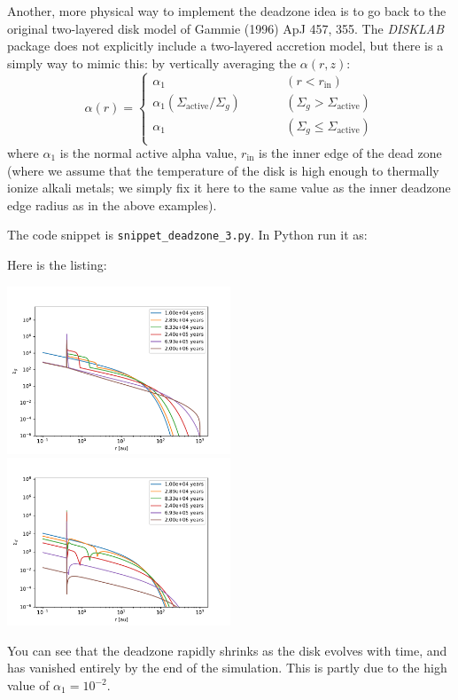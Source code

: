\documentclass{book}
\newcommand{\code}[1]{{\small\tt #1}}
\begin{document}
Another, more physical way to implement the deadzone idea is to go back to the
original two-layered disk model of Gammie (1996) ApJ 457, 355. The {\sl DISKLAB}
package does not explicitly include a two-layered accretion model, but there is
a simply way to mimic this: by vertically averaging the $\alpha(r,z)$:
\begin{equation}
  \alpha(r) = \left\{
\begin{matrix}
  \alpha_1 & \qquad & (r<r_{\mathrm{in}}) \\
  \alpha_1 (\Sigma_{\mathrm{active}}/\Sigma_g)& \qquad & (\Sigma_g>\Sigma_{\mathrm{active}}) \\
  \alpha_1 & \qquad & (\Sigma_g\le \Sigma_{\mathrm{active}}) \\
\end{matrix}
  \right.
\end{equation}
where $\alpha_1$ is the normal active alpha value, $r_{\mathrm{in}}$ is the inner edge of
the dead zone (where we assume that the temperature of the disk is high enough
to thermally ionize alkali metals; we simply fix it here to the same value as the
inner deadzone edge radius as in the above examples).

The code snippet is
\code{snippet\_deadzone\_3.py}. In Python run it as:
\begin{codebox}
\end{codebox}
Here is the listing:

\centerline{\includegraphics[width=0.5\textwidth]{../snippets/fig_snippet_deadzone_3_1.pdf}
  \includegraphics[width=0.5\textwidth]{../snippets/fig_snippet_deadzone_3_2.pdf}}
You can see that the deadzone rapidly shrinks as the disk evolves with time, and
has vanished entirely by the end of the simulation. This is
partly due to the high value of $\alpha_1=10^{-2}$.
\end{document}
